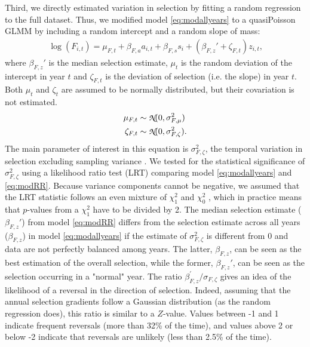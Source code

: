 Third, we directly estimated variation in selection by fitting a random regression to the full dataset. Thus, we modified model \ref{eq:modallyears} to a quasiPoisson GLMM by including a random intercept and a random slope of mass:
\begin{align}
\log(F_{i,t}) = \mu_{F,t} + \beta_{F,a} a_{i,t} + \beta_{F,s} s_{i} + (\beta_{F,z}' + \zeta_{F,t})z_{i,t} \text{,}
\label{eq:modRR}
\end{align}
where $\beta_{F,z}'$ is the median selection estimate, $\mu_t$ is the random deviation of the intercept in year $t$ and $\zeta_{F,t}$ is the deviation of selection (i.e. the slope) in year $t$. Both $\mu_t$ and $\zeta_t$ are assumed to be normally distributed, but their covariation is not estimated. 
\begin{align}
\mu_{F,t} & \sim\text{{\fontfamily{pzc}\selectfont N}}(0,\sigma_{F,\mu}^2)\\
\zeta_{F,t} &\sim \text{{\fontfamily{pzc}\selectfont N}}(0,\sigma_{F,\zeta}^2)\text{.}
\end{align}
The main parameter of interest in this equation is $\sigma_{F,\zeta}^2$, the temporal variation in selection excluding sampling variance \parencite{Chevin2015b}. We tested for the statistical significance of  $\sigma_{F,\zeta}^2$ using a likelihood ratio test (LRT) \parencite[see e.g.][]{Pinheiro2000,Crainiceanu2004} comparing model \ref{eq:modallyears} and
\ref{eq:modRR}. Because variance components cannot be negative, we assumed that the LRT statistic follows an even mixture of $\chi_{1}^2$ and $\chi_{0}^2$ \parencite{Self1987}, which in practice means that $p$-values from a $\chi_{1}^2$ have to be divided by 2.
The median selection estimate ($\beta_{F,z}'$) from model \ref{eq:modRR} differs from the selection estimate across all years ($\beta_{F,z}$) in model \ref{eq:modallyears} if the estimate of $\sigma_{F,\zeta}^2$ is different from 0 and data are not perfectly balanced among years. The latter, $\beta_{F,z}$, can be seen as the best estimation of the overall selection, while the former, $\beta_{F,z}'$, can be seen as the selection occurring in a "normal" year. The ratio $\beta_{F,z}^\prime/\sigma_{F,\zeta} $ gives an idea of the likelihood of a reversal in the direction of selection. Indeed, assuming that the annual selection gradients follow a Gaussian distribution (as the random regression does), this ratio is similar to a $Z$-value. Values between -1 and 1 indicate frequent reversals (more than 32\% of the time), and values above 2 or below -2 indicate that reversals are unlikely (less than 2.5\% of the time). 

